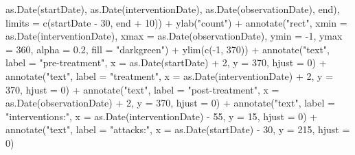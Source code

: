 \documentclass[
  10pt,
  dvipsnames, enabledeprecatedfontcommands]{scrartcl}
\newenvironment{Shaded}{\begin{snugshade}}{\end{snugshade}}
\newcommand{\AttributeTok}[1]{\textcolor[rgb]{0.77,0.63,0.00}{#1}}
\newcommand{\DecValTok}[1]{\textcolor[rgb]{0.00,0.00,0.81}{#1}}
\newcommand{\FloatTok}[1]{\textcolor[rgb]{0.00,0.00,0.81}{#1}}
\newcommand{\FunctionTok}[1]{\textcolor[rgb]{0.00,0.00,0.00}{#1}}
\newcommand{\NormalTok}[1]{#1}
\newcommand{\SpecialCharTok}[1]{\textcolor[rgb]{0.00,0.00,0.00}{#1}}
\newcommand{\StringTok}[1]{\textcolor[rgb]{0.31,0.60,0.02}{#1}}
\begin{document}
\begin{Shaded}
\begin{Highlighting}[]
    \FunctionTok{as.Date}\NormalTok{(startDate), }\FunctionTok{as.Date}\NormalTok{(interventionDate), }\FunctionTok{as.Date}\NormalTok{(observationDate),}
\NormalTok{    end), }\AttributeTok{limits =} \FunctionTok{c}\NormalTok{(startDate }\SpecialCharTok{{-}} \DecValTok{30}\NormalTok{, end }\SpecialCharTok{+} \DecValTok{10}\NormalTok{)) }\SpecialCharTok{+} \FunctionTok{ylab}\NormalTok{(}\StringTok{"count"}\NormalTok{) }\SpecialCharTok{+} \FunctionTok{annotate}\NormalTok{(}\StringTok{"rect"}\NormalTok{,}
    \AttributeTok{xmin =} \FunctionTok{as.Date}\NormalTok{(interventionDate), }\AttributeTok{xmax =} \FunctionTok{as.Date}\NormalTok{(observationDate),}
    \AttributeTok{ymin =} \SpecialCharTok{{-}}\DecValTok{1}\NormalTok{, }\AttributeTok{ymax =} \DecValTok{360}\NormalTok{, }\AttributeTok{alpha =} \FloatTok{0.2}\NormalTok{, }\AttributeTok{fill =} \StringTok{"darkgreen"}\NormalTok{) }\SpecialCharTok{+} \FunctionTok{ylim}\NormalTok{(}\FunctionTok{c}\NormalTok{(}\SpecialCharTok{{-}}\DecValTok{1}\NormalTok{,}
    \DecValTok{370}\NormalTok{)) }\SpecialCharTok{+} \FunctionTok{annotate}\NormalTok{(}\StringTok{"text"}\NormalTok{, }\AttributeTok{label =} \StringTok{"pre{-}treatment"}\NormalTok{, }\AttributeTok{x =} \FunctionTok{as.Date}\NormalTok{(startDate) }\SpecialCharTok{+}
    \DecValTok{2}\NormalTok{, }\AttributeTok{y =} \DecValTok{370}\NormalTok{, }\AttributeTok{hjust =} \DecValTok{0}\NormalTok{) }\SpecialCharTok{+} \FunctionTok{annotate}\NormalTok{(}\StringTok{"text"}\NormalTok{, }\AttributeTok{label =} \StringTok{"treatment"}\NormalTok{, }\AttributeTok{x =} \FunctionTok{as.Date}\NormalTok{(interventionDate) }\SpecialCharTok{+}
    \DecValTok{2}\NormalTok{, }\AttributeTok{y =} \DecValTok{370}\NormalTok{, }\AttributeTok{hjust =} \DecValTok{0}\NormalTok{) }\SpecialCharTok{+} \FunctionTok{annotate}\NormalTok{(}\StringTok{"text"}\NormalTok{, }\AttributeTok{label =} \StringTok{"post{-}treatment"}\NormalTok{,}
    \AttributeTok{x =} \FunctionTok{as.Date}\NormalTok{(observationDate) }\SpecialCharTok{+} \DecValTok{2}\NormalTok{, }\AttributeTok{y =} \DecValTok{370}\NormalTok{, }\AttributeTok{hjust =} \DecValTok{0}\NormalTok{) }\SpecialCharTok{+} \FunctionTok{annotate}\NormalTok{(}\StringTok{"text"}\NormalTok{,}
    \AttributeTok{label =} \StringTok{"interventions:"}\NormalTok{, }\AttributeTok{x =} \FunctionTok{as.Date}\NormalTok{(interventionDate) }\SpecialCharTok{{-}} \DecValTok{55}\NormalTok{, }\AttributeTok{y =} \DecValTok{15}\NormalTok{,}
    \AttributeTok{hjust =} \DecValTok{0}\NormalTok{) }\SpecialCharTok{+} \FunctionTok{annotate}\NormalTok{(}\StringTok{"text"}\NormalTok{, }\AttributeTok{label =} \StringTok{"attacks:"}\NormalTok{, }\AttributeTok{x =} \FunctionTok{as.Date}\NormalTok{(startDate) }\SpecialCharTok{{-}}
    \DecValTok{30}\NormalTok{, }\AttributeTok{y =} \DecValTok{215}\NormalTok{, }\AttributeTok{hjust =} \DecValTok{0}\NormalTok{)}


\end{Highlighting}
\end{Shaded}
\end{document}
